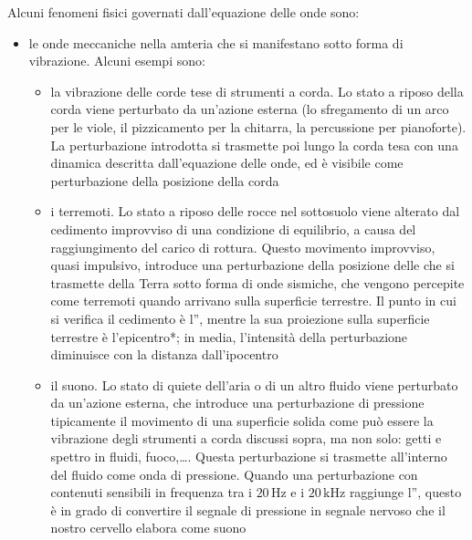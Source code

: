 \documentclass[letterpaper,10pt,italian]{jupyterBook}
\begin{document}
\sphinxAtStartPar
Alcuni fenomeni fisici governati dall’equazione delle onde sono:
\begin{itemize}
\item {} 
\sphinxAtStartPar
le onde meccaniche nella amteria che si manifestano sotto forma di vibrazione. Alcuni esempi sono:
\begin{itemize}
\item {} 
\sphinxAtStartPar
la vibrazione delle corde tese di strumenti a corda. Lo stato a riposo della corda viene perturbato da un’azione esterna (lo sfregamento di un arco per le viole, il pizzicamento per la chitarra, la percussione per pianoforte). La perturbazione introdotta si trasmette poi lungo la corda tesa con una dinamica descritta dall’equazione delle onde, ed è visibile come perturbazione della posizione della corda

\item {} 
\sphinxAtStartPar
i terremoti. Lo stato a riposo delle rocce nel sottosuolo viene alterato dal cedimento improvviso di una condizione di equilibrio, a causa del raggiungimento del carico di rottura. Questo movimento improvviso, quasi impulsivo, introduce una perturbazione della posizione delle che si trasmette  della Terra sotto forma di onde sismiche, che vengono percepite come terremoti quando arrivano sulla superficie terrestre. Il punto in cui si verifica il cedimento è l”, mentre la sua proiezione sulla superficie terrestre è l’epicentro*; in media, l’intensità della perturbazione diminuisce con la distanza dall’ipocentro

\item {} 
\sphinxAtStartPar
il suono. Lo stato di quiete dell’aria o di un altro fluido viene perturbato da un’azione esterna, che introduce una perturbazione di pressione \sphinxhyphen{} tipicamente il movimento di una superficie solida come può essere la vibrazione degli strumenti a corda discussi sopra, ma non solo:  getti e spettro in fluidi, fuoco,…. Questa perturbazione si trasmette all’interno del fluido come onda di pressione. Quando una perturbazione con contenuti sensibili in frequenza tra i \(20 \, \text{Hz}\) e i \(20 \, \text{kHz}\) raggiunge l”{\hyperref[\detokenize{ch/intro/sensing-hearing:physics-hs-intro-sensing-hearing}]{}}, questo è in grado di convertire il segnale di pressione in segnale nervoso che il nostro cervello elabora come suono


\end{itemize}
\end{itemize}
\end{document}
